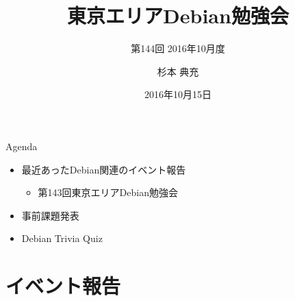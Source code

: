 \title{東京エリアDebian勉強会}
\subtitle{第144回 2016年10月度}
\author{杉本 典充}
\date{2016年10月15日}



\begin{frame}
\titlepage{}
\end{frame}

\begin{frame}{Agenda}
 \begin{minipage}[t]{0.45\hsize}
  \begin{itemize}
  \item 最近あったDebian関連のイベント報告
	\begin{itemize}
	\item 第143回東京エリアDebian勉強会
	\end{itemize}
  \item 事前課題発表
  \end{itemize}
 \end{minipage}
 \begin{minipage}[t]{0.45\hsize}
  \begin{itemize}
   \item Debian Trivia Quiz
  \end{itemize}
 \end{minipage}
\end{frame}

\section{イベント報告}

